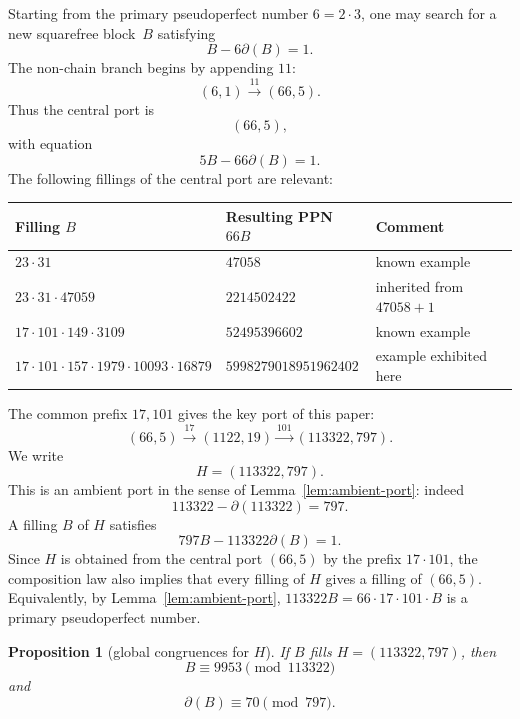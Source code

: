 \documentclass[11pt]{amsart}
\theoremstyle{plain}
\newtheorem{proposition}[theorem]{Proposition}
\theoremstyle{definition}
\theoremstyle{remark}
\newcommand{\dd}{\partial}
\begin{document}
Starting from the primary pseudoperfect number $6=2\cdot3$, one may search for a new squarefree block~$B$ satisfying
\[
        B-6\dd(B)=1.
\]
The non-chain branch begins by appending $11$:
\[
        (6,1)\xrightarrow{11}(66,5).
\]
Thus the central port is
\[
        (66,5),
\]
with equation
\begin{equation}\label{eq:central-port}
        5B-66\dd(B)=1.
\end{equation}
The following fillings of the central port are relevant:
\begin{center}
\begin{tabular}{lll}
\toprule
Filling $B$ & Resulting PPN $66B$ & Comment \\
\midrule
$23\cdot31$ & $47058$ & known example \\
$23\cdot31\cdot47059$ & $2214502422$ & inherited from $47058+1$ \\
$17\cdot101\cdot149\cdot3109$ & $52495396602$ & known example \\
$17\cdot101\cdot157\cdot1979\cdot10093\cdot16879$ & $5998279018951962402$ & example exhibited here \\
\bottomrule
\end{tabular}
\end{center}

The common prefix $17,101$ gives the key port of this paper:
\[
        (66,5)\xrightarrow{17}(1122,19)\xrightarrow{101}(113322,797).
\]
We write
\begin{equation}\label{eq:H-def}
        H=(113322,797).
\end{equation}
This is an ambient port in the sense of Lemma~\ref{lem:ambient-port}: indeed
\[
        113322-\dd(113322)=797.
\]
A filling $B$ of $H$ satisfies
\begin{equation}\label{eq:H-fill}
        797B-113322\dd(B)=1.
\end{equation}
Since $H$ is obtained from the central port $(66,5)$ by the prefix $17\cdot101$, the composition law also implies that every filling of $H$ gives a filling of $(66,5)$.  Equivalently, by Lemma~\ref{lem:ambient-port}, $113322B=66\cdot17\cdot101\cdot B$ is a primary pseudoperfect number.

\begin{proposition}[global congruences for $H$]\label{prop:H-congruences}
If $B$ fills $H=(113322,797)$, then
\begin{equation}\label{eq:H-B-congruence}
        B\equiv9953\pmod{113322}
\end{equation}
and
\begin{equation}\label{eq:H-der-congruence}
        \dd(B)\equiv70\pmod{797}.
\end{equation}
\end{proposition}
\end{document}
